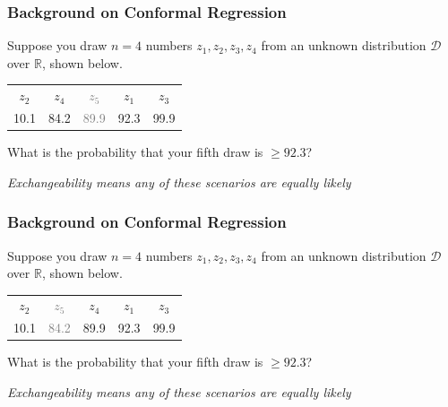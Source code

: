 \documentclass[handout]{beamer}
\begin{document}
\begin{frame}
    \frametitle{Background on Conformal Regression \cite{lei2018distribution}}

    Suppose you draw $n=4$ numbers $z_1, z_2, z_3, z_4$ from an unknown distribution $\mathcal{D}$ over $\mathbb{R}$, shown below.

    \vspace{3em}

    \begin{center}
    \begin{tabular}{ccccc}
    $z_2$ & $z_4$ & \textcolor{gray}{$z_5$} & $z_1$ & $z_3$ \\
    10.1 & 84.2 & \textcolor{gray}{89.9} & 92.3 & 99.9
    \end{tabular}
    \end{center}
    
    \vspace{3em}

    What is the probability that your fifth draw is $\geq 92.3$? 

    \vspace{1em}

    \textit{Exchangeability means any of these scenarios are equally likely}

\end{frame}

\begin{frame}
    \frametitle{Background on Conformal Regression \cite{lei2018distribution}}

    Suppose you draw $n=4$ numbers $z_1, z_2, z_3, z_4$ from an unknown distribution $\mathcal{D}$ over $\mathbb{R}$, shown below.

    \vspace{3em}

    \begin{center}
    \begin{tabular}{ccccc}
    $z_2$ & \textcolor{gray}{$z_5$} & $z_4$ & $z_1$ & $z_3$ \\
    10.1 & \textcolor{gray}{84.2} & 89.9 & 92.3 & 99.9
    \end{tabular}
    \end{center}
    
    \vspace{3em}

    What is the probability that your fifth draw is $\geq 92.3$? 

    \vspace{1em}

    \textit{Exchangeability means any of these scenarios are equally likely}

\end{frame}
\end{document}
